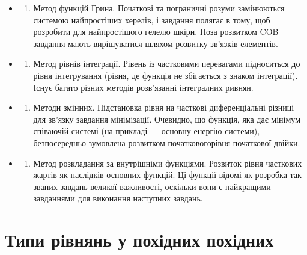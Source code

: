 \documentclass[
  ukrainian,
]{article}
\providecommand{\tightlist}{%
  \setlength{\itemsep}{0pt}\setlength{\parskip}{0pt}}
\begin{document}
\begin{itemize}
\tightlist
\item
  \begin{enumerate}
  \def\labelenumi{\arabic{enumi}.}
  \setcounter{enumi}{6}
  \tightlist
  \item
    Метод функцій Грина. Початкові та пограничні розуми замінюються
    системою найпростіших херелів, і завдання полягає в тому, щоб
    розробити для найпростішого гелелю шкіри. Поза розвитком COB
    завдання мають вирішуватися шляхом розвитку зв'язків елементів.
  \end{enumerate}
\item
  \begin{enumerate}
  \def\labelenumi{\arabic{enumi}.}
  \setcounter{enumi}{7}
  \tightlist
  \item
    Метод рівнів інтеграції. Рівень із частковими перевагами підноситься
    до рівня інтегрування (рівня, де функція не збігається з знаком
    інтеграції). Існує багато різних методів розв'язанні інтегралних
    ривнян.
  \end{enumerate}
\item
  \begin{enumerate}
  \def\labelenumi{\arabic{enumi}.}
  \setcounter{enumi}{8}
  \tightlist
  \item
    Методи змінних. Підстановка рівня на часткові диференціальні різниці
    для зв'язку завдання мінімізації. Очевидно, що функція, яка дає
    мінімум співаючій системі (на прикладі --- основну енергію системи),
    безпосередньо зумовлена розвитком початковогорівня початкової
    двійки.
  \end{enumerate}
\item
  \begin{enumerate}
  \def\labelenumi{\arabic{enumi}.}
  \setcounter{enumi}{9}
  \tightlist
  \item
    Метод розкладання за внутрішніми функціями. Розвиток рівня часткових
    жартів як наслідків основних функцій. Ці функції відомі як розробка
    так званих завдань великої важливості, оскільки вони є найкращими
    завданнями для виконання наступних завдань.
  \end{enumerate}
\end{itemize}

\section{Типи рівнянь у похідних
похідних}\label{ux442ux438ux43fux438-ux440ux456ux432ux43dux44fux43dux44c-ux443-ux43fux43eux445ux456ux434ux43dux438ux445-ux43fux43eux445ux456ux434ux43dux438ux445}
\end{document}

